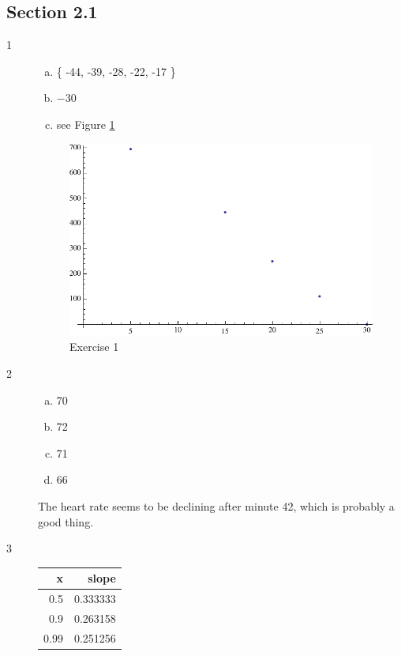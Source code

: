 \documentclass[letterpaper, landscape]{exam}
\begin{document}
    \subsection{Section 2.1}
    \begin{description}

      \item[1]
        \begin{enumerate}[(a)]
          \item \{ -44, -39, -28, -22, -17 \}
          \item $-30$
          \item see Figure \ref{fig:ex01}
        \end{enumerate}

        \begin{figure}[H]
          \centering
          \includegraphics[scale = 0.5]{ex01.pdf}
          \caption{Exercise 1}
          \label{fig:ex01}
        \end{figure}

      \item[2]
        \begin{enumerate}[(a)]
          \item 70
          \item 72
          \item 71
          \item 66
        \end{enumerate}

        The heart rate seems to be declining after minute 42, which is probably
        a good thing.

      \item[3]
        \begin{tabular}[H]{rr}
          \toprule
          x   & slope \\
          \midrule
          0.5 & 0.333333 \\
          0.9 & 0.263158 \\
          0.99 & 0.251256 \\
        \end{tabular}


\end{description}
\end{document}
